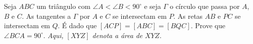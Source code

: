 Seja $ABC$ um triângulo com $\angle A < \angle B < 90^\circ$ e seja $\Gamma$ o círculo que passa por $A$, $B$ e $C$. As tangentes a $\Gamma$ por $A$ e $C$ se intersectam em $P$. As retas $AB$ e $PC$ se intersectam em $Q$. É dado que $[ACP] = [ABC] = [BQC]$. Prove que $\angle BCA = 90^\circ$. \textit{Aqui, $[XYZ]$ denota a área de $XYZ$.}